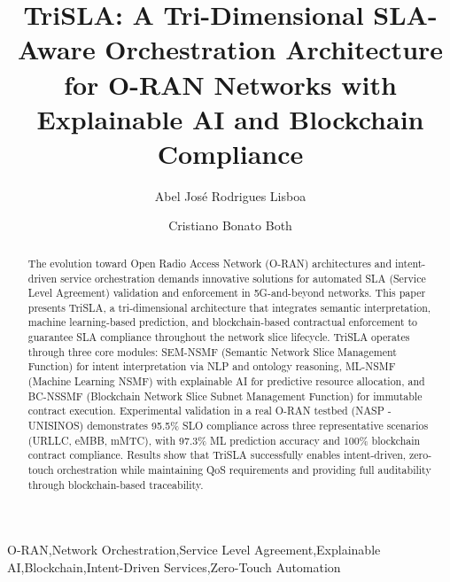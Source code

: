 \documentclass[review]{elsarticle}
\begin{document}
\begin{frontmatter}

\title{TriSLA: A Tri-Dimensional SLA-Aware Orchestration Architecture for O-RAN Networks with Explainable AI and Blockchain Compliance}

\author[unisinos]{Abel Jos\'e Rodrigues Lisboa}

\author[unisinos]{Cristiano Bonato Both}


\begin{abstract}
The evolution toward Open Radio Access Network (O-RAN) architectures and intent-driven service orchestration demands innovative solutions for automated SLA (Service Level Agreement) validation and enforcement in 5G-and-beyond networks. This paper presents TriSLA, a tri-dimensional architecture that integrates semantic interpretation, machine learning-based prediction, and blockchain-based contractual enforcement to guarantee SLA compliance throughout the network slice lifecycle. TriSLA operates through three core modules: SEM-NSMF (Semantic Network Slice Management Function) for intent interpretation via NLP and ontology reasoning, ML-NSMF (Machine Learning NSMF) with explainable AI for predictive resource allocation, and BC-NSSMF (Blockchain Network Slice Subnet Management Function) for immutable contract execution. Experimental validation in a real O-RAN testbed (NASP - UNISINOS) demonstrates 95.5\% SLO compliance across three representative scenarios (URLLC, eMBB, mMTC), with 97.3\% ML prediction accuracy and 100\% blockchain contract compliance. Results show that TriSLA successfully enables intent-driven, zero-touch orchestration while maintaining QoS requirements and providing full auditability through blockchain-based traceability.
\end{abstract}

\begin{keyword}
O-RAN\sep Network Orchestration\sep Service Level Agreement\sep Explainable AI\sep Blockchain\sep Intent-Driven Services\sep Zero-Touch Automation
\end{keyword}

\end{frontmatter}
\end{document}
